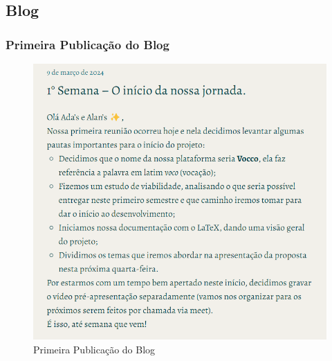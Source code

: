 \begin{apendicesenv}
\chapter{Blog}
\label{apendice_k}
\subsection*{Primeira Publicação do Blog}
\begin{figure}[H]
    \centering
    \includegraphics[width=1.0\linewidth]{images/Post1.png}
    \caption{Primeira Publicação do Blog}
    \label{fig:primeira}
\end{figure}


\end{apendicesenv}
